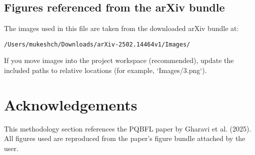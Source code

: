 \documentclass[11pt]{article}
\begin{document}
\subsection*{Figures referenced from the arXiv bundle}
The images used in this file are taken from the downloaded arXiv bundle at:
\begin{verbatim}
/Users/mukeshch/Downloads/arXiv-2502.14464v1/Images/
\end{verbatim}
If you move images into the project workspace (recommended), update the included paths to relative locations (for example, `Images/3.png`).

\section*{Acknowledgements}
This methodology section references the PQBFL paper by Gharavi et al. (2025). All figures used are reproduced from the paper's figure bundle attached by the user.
\end{document}
